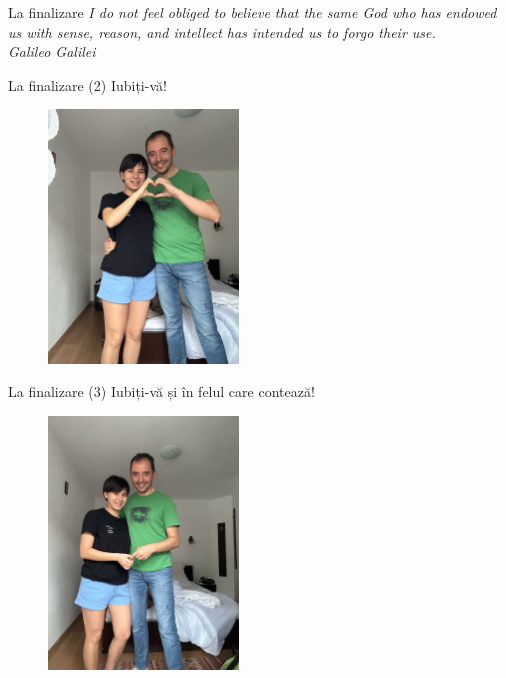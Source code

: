 \documentclass{simple}
\begin{document}
\begin{frame}{La finalizare}
  \centering
  \vspace{5mm}
  \textit{I do not feel obliged to believe that the same God who has endowed us with sense, reason, and intellect has intended us to forgo their use.} \\
  \vspace{3mm}
  \hfill \textit{Galileo Galilei}
\end{frame}

\begin{frame}{La finalizare (2)}
  \centering
  \pause
  \Large
  Iubiți-vă! \\
  \vspace{5mm}
  \pause
  \begin{figure}
    \centering
    \includegraphics[width=0.45\textwidth]{img/ad-rd-heart-fingers.jpeg}
  \end{figure}
\end{frame}

\begin{frame}{La finalizare (3)}
  \centering
  \pause
  \Large
  Iubiți-vă și în felul care contează! \\
  \vspace{5mm}
  \pause
  \begin{figure}
    \centering
    \includegraphics[width=0.45\textwidth]{img/ad-rd-finger-in.jpeg}
  \end{figure}
\end{frame}
\end{document}
